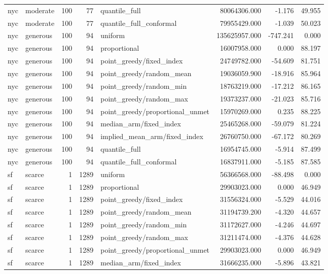 \begin{tabular}{llrrlrrr}
nyc & moderate & 100 & 77 & quantile\_full & 80064306.000 & -1.176 & 49.955 \\
nyc & moderate & 100 & 77 & quantile\_full\_conformal & 79955429.000 & -1.039 & 50.023 \\
nyc & generous & 100 & 94 & uniform & 135625957.000 & -747.241 & 0.000 \\
nyc & generous & 100 & 94 & proportional & 16007958.000 & 0.000 & 88.197 \\
nyc & generous & 100 & 94 & point\_greedy/fixed\_index & 24749782.000 & -54.609 & 81.751 \\
nyc & generous & 100 & 94 & point\_greedy/random\_mean & 19036059.900 & -18.916 & 85.964 \\
nyc & generous & 100 & 94 & point\_greedy/random\_min & 18763219.000 & -17.212 & 86.165 \\
nyc & generous & 100 & 94 & point\_greedy/random\_max & 19373237.000 & -21.023 & 85.716 \\
nyc & generous & 100 & 94 & point\_greedy/proportional\_unmet & 15970269.000 & 0.235 & 88.225 \\
nyc & generous & 100 & 94 & median\_arm/fixed\_index & 25465268.000 & -59.079 & 81.224 \\
nyc & generous & 100 & 94 & implied\_mean\_arm/fixed\_index & 26760750.000 & -67.172 & 80.269 \\
nyc & generous & 100 & 94 & quantile\_full & 16954745.000 & -5.914 & 87.499 \\
nyc & generous & 100 & 94 & quantile\_full\_conformal & 16837911.000 & -5.185 & 87.585 \\
sf & scarce & 1 & 1289 & uniform & 56366568.000 & -88.498 & 0.000 \\
sf & scarce & 1 & 1289 & proportional & 29903023.000 & 0.000 & 46.949 \\
sf & scarce & 1 & 1289 & point\_greedy/fixed\_index & 31556324.000 & -5.529 & 44.016 \\
sf & scarce & 1 & 1289 & point\_greedy/random\_mean & 31194739.200 & -4.320 & 44.657 \\
sf & scarce & 1 & 1289 & point\_greedy/random\_min & 31172627.000 & -4.246 & 44.697 \\
sf & scarce & 1 & 1289 & point\_greedy/random\_max & 31211474.000 & -4.376 & 44.628 \\
sf & scarce & 1 & 1289 & point\_greedy/proportional\_unmet & 29903023.000 & 0.000 & 46.949 \\
sf & scarce & 1 & 1289 & median\_arm/fixed\_index & 31666235.000 & -5.896 & 43.821 \\

\end{tabular}
